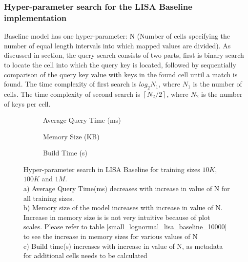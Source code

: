 \subsubsection {Hyper-parameter search for the LISA Baseline implementation}
Baseline model has one hyper-parameter: N (Number of cells specifying the number of equal length intervals into which mapped values are divided). As discussed in section, the query search consists of two parts, first is binary search to locate the cell into which the query key is located, followed by sequentially comparison of the query key value with keys in the found cell until a match is found. The time complexity of first search is $log_{2}N_{1}$, where $N_{1}$ is the number of cells. The time complexity of second search is  $ \left \lceil {N_{2} / 2}\right \rceil $, where $N_{2}$ is the number of keys per cell.  

\begin{figure}
 \centering
     \begin{subfigure}[t]{0.32\textwidth}
         \centering
         
         \caption{Average Query Time (ms)}
         \label{fig:2d_exp3_1_1}
     \end{subfigure}
     \hfill
     \begin{subfigure}[t]{0.32\textwidth}
         \centering
         
         \caption{Memory Size (KB)}
         \label{fig:2d_exp3_1_2}
     \end{subfigure}
     \hfill
     \begin{subfigure}[t]{0.32\textwidth}
         \centering
         
         \caption{Build Time (s)}
         \label{fig:2d_exp3_1_3}
     \end{subfigure}
        \caption{Hyper-parameter search in LISA Baseline for training sizes $10K$, $100K$ and $1M$.\\ 
        a) Average Query Time(ms) decreases with increase in value of N for all training sizes. \\
        b) Memory size of the model increases with increase in value of N. Increase in memory size is is not very intuitive because of plot scales. Please refer to table \ref{small_lognormal_lisa_baseline_10000} to see the increase in memory sizes for various values of N \\
        c) Build time(s) increases with increase in value of N, as metadata for additional cells needs to be calculated
        }
        \label{fig:LISA_Baseline_Hyperparameter_Search}
\end{figure}




